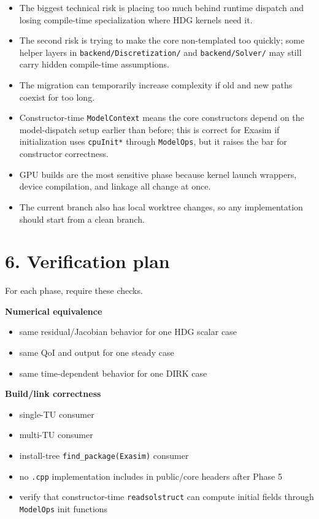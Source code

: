 \documentclass[11pt]{article}
\begin{document}
\begin{itemize}[leftmargin=*]
\item The biggest technical risk is placing too much behind runtime dispatch and losing compile-time specialization where HDG kernels need it.
\item The second risk is trying to make the core non-templated too quickly; some helper layers in \texttt{backend/Discretization/} and \texttt{backend/Solver/} may still carry hidden compile-time assumptions.
\item The migration can temporarily increase complexity if old and new paths coexist for too long.
\item Constructor-time \texttt{ModelContext} means the core constructors depend on the model-dispatch setup earlier than before; this is correct for Exasim if initialization uses \texttt{cpuInit*} through \texttt{ModelOps}, but it raises the bar for constructor correctness.
\item GPU builds are the most sensitive phase because kernel launch wrappers, device compilation, and linkage all change at once.
\item The current branch also has local worktree changes, so any implementation should start from a clean branch.
\end{itemize}

\section*{6. Verification plan}

For each phase, require these checks.

\textbf{Numerical equivalence}
\begin{itemize}[leftmargin=*]
\item same residual/Jacobian behavior for one HDG scalar case
\item same QoI and output for one steady case
\item same time-dependent behavior for one DIRK case
\end{itemize}

\textbf{Build/link correctness}
\begin{itemize}[leftmargin=*]
\item single-TU consumer
\item multi-TU consumer
\item install-tree \texttt{find\_package(Exasim)} consumer
\item no \texttt{.cpp} implementation includes in public/core headers after Phase 5
\item verify that constructor-time \texttt{readsolstruct} can compute initial fields through \texttt{ModelOps} init functions
\end{itemize}
\end{document}
